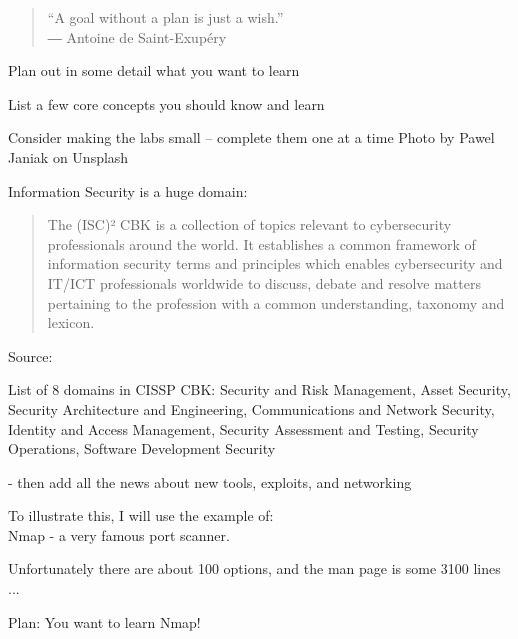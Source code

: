 \documentclass[Screen16to9,17pt]{foils}
\begin{document}

\begin{quote}
  “A goal without a plan is just a wish.”\\
  ― Antoine de Saint-Exupéry
\end{quote}


\begin{list1}
\item Plan out in some detail what you want to learn
\item List a few core concepts you should know and learn
\item Consider making the labs small -- complete them one at a time
\hskip 2cm {\footnotesize Photo by Pawel Janiak on Unsplash}
\end{list1}



Information Security is a huge domain:

\begin{quote}
The (ISC)² CBK is a collection of topics relevant to cybersecurity professionals around the world. It establishes a common framework of information security terms and principles which enables cybersecurity and IT/ICT professionals worldwide to discuss, debate and resolve matters pertaining to the profession with a common understanding, taxonomy and lexicon.
\end{quote}
Source: 

List of 8 domains in CISSP CBK: Security and Risk Management, Asset Security,
Security Architecture and Engineering, Communications and Network Security, Identity and Access Management, Security Assessment and Testing, Security Operations, Software Development Security

- then add all the news about new tools, exploits, and networking




To illustrate this, I will use the example of:\\
Nmap - a very famous port scanner.

Unfortunately there are about 100 options, and the man page is some 3100 lines ...


Plan: You want to learn Nmap!
\end{document}
